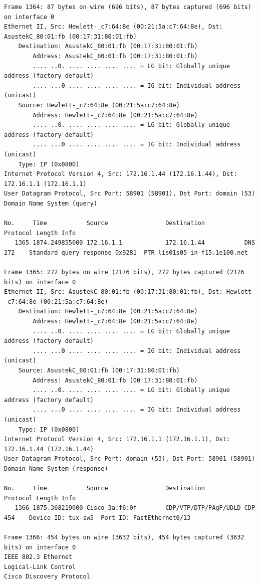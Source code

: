 \documentclass[a4paper,11pt]{article}
\begin{document}
\begin{lstlisting}
Frame 1364: 87 bytes on wire (696 bits), 87 bytes captured (696 bits) on interface 0
Ethernet II, Src: Hewlett-_c7:64:8e (00:21:5a:c7:64:8e), Dst: AsustekC_80:01:fb (00:17:31:80:01:fb)
    Destination: AsustekC_80:01:fb (00:17:31:80:01:fb)
        Address: AsustekC_80:01:fb (00:17:31:80:01:fb)
        .... ..0. .... .... .... .... = LG bit: Globally unique address (factory default)
        .... ...0 .... .... .... .... = IG bit: Individual address (unicast)
    Source: Hewlett-_c7:64:8e (00:21:5a:c7:64:8e)
        Address: Hewlett-_c7:64:8e (00:21:5a:c7:64:8e)
        .... ..0. .... .... .... .... = LG bit: Globally unique address (factory default)
        .... ...0 .... .... .... .... = IG bit: Individual address (unicast)
    Type: IP (0x0800)
Internet Protocol Version 4, Src: 172.16.1.44 (172.16.1.44), Dst: 172.16.1.1 (172.16.1.1)
User Datagram Protocol, Src Port: 58901 (58901), Dst Port: domain (53)
Domain Name System (query)

No.     Time           Source                Destination           Protocol Length Info
   1365 1874.249855000 172.16.1.1            172.16.1.44           DNS      272    Standard query response 0x9281  PTR lis01s05-in-f15.1e100.net

Frame 1365: 272 bytes on wire (2176 bits), 272 bytes captured (2176 bits) on interface 0
Ethernet II, Src: AsustekC_80:01:fb (00:17:31:80:01:fb), Dst: Hewlett-_c7:64:8e (00:21:5a:c7:64:8e)
    Destination: Hewlett-_c7:64:8e (00:21:5a:c7:64:8e)
        Address: Hewlett-_c7:64:8e (00:21:5a:c7:64:8e)
        .... ..0. .... .... .... .... = LG bit: Globally unique address (factory default)
        .... ...0 .... .... .... .... = IG bit: Individual address (unicast)
    Source: AsustekC_80:01:fb (00:17:31:80:01:fb)
        Address: AsustekC_80:01:fb (00:17:31:80:01:fb)
        .... ..0. .... .... .... .... = LG bit: Globally unique address (factory default)
        .... ...0 .... .... .... .... = IG bit: Individual address (unicast)
    Type: IP (0x0800)
Internet Protocol Version 4, Src: 172.16.1.1 (172.16.1.1), Dst: 172.16.1.44 (172.16.1.44)
User Datagram Protocol, Src Port: domain (53), Dst Port: 58901 (58901)
Domain Name System (response)

No.     Time           Source                Destination           Protocol Length Info
   1366 1875.368219000 Cisco_3a:f6:0f        CDP/VTP/DTP/PAgP/UDLD CDP      454    Device ID: tux-sw5  Port ID: FastEthernet0/13  

Frame 1366: 454 bytes on wire (3632 bits), 454 bytes captured (3632 bits) on interface 0
IEEE 802.3 Ethernet 
Logical-Link Control
Cisco Discovery Protocol


\end{lstlisting}
\end{document}
